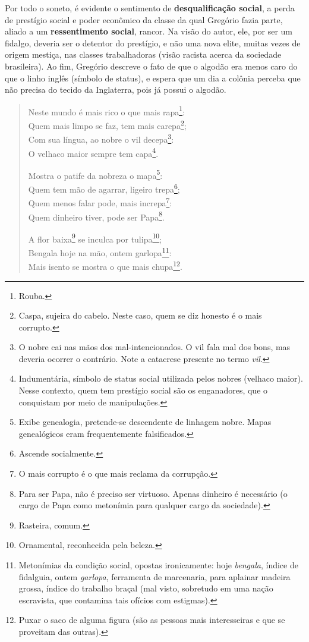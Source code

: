 Por todo o soneto, é evidente o sentimento de \textbf{desqualificação social}, a perda de prestígio social e poder econômico da classe da qual Gregório fazia parte, aliado a um \textbf{ressentimento social}, rancor. Na visão do autor, ele, por ser um fidalgo, deveria ser o detentor do prestígio, e não uma nova elite, muitas vezes de origem mestiça, nas classes trabalhadoras (visão racista acerca da sociedade brasileira). Ao fim, Gregório descreve o fato de que o algodão era menos caro do que o linho inglês (símbolo de status), e espera que um dia a colônia perceba que não precisa do tecido da Inglaterra, pois já possui o algodão.

\begin{verse}
Neste mundo é mais rico o que mais rapa\footnote{Rouba.}: \\
Quem mais limpo se faz, tem mais carepa\footnote{Caspa, sujeira do cabelo. Neste caso, quem se diz honesto é o mais corrupto.}; \\
Com sua língua, ao nobre o vil decepa\footnote{O nobre cai nas mãos dos mal-intencionados. O vil fala mal dos bons, mas deveria ocorrer o contrário. Note a catacrese presente no termo \textit{vil}.}: \\
O velhaco maior sempre tem capa\footnote{Indumentária, símbolo de status social utilizada pelos nobres (velhaco maior). Nesse contexto, quem tem prestígio social são os enganadores, que o conquistam por meio de manipulações.}.
			
Mostra o patife da nobreza o mapa\footnote{Exibe genealogia, pretende-se descendente de linhagem nobre. Mapas genealógicos eram frequentemente falsificados.}: \\
Quem tem mão de agarrar, ligeiro trepa\footnote{Ascende socialmente.}; \\
Quem menos falar pode, mais increpa\footnote{O mais corrupto é o que mais reclama da corrupção.}: \\
Quem dinheiro tiver, pode ser Papa\footnote{Para ser Papa, não é preciso ser virtuoso. Apenas dinheiro é necessário (o cargo de Papa como metonímia para qualquer cargo da sociedade).}. 
			
A flor baixa\footnote{Rasteira, comum.} se inculca por tulipa\footnote{Ornamental, reconhecida pela beleza.}; \\
Bengala hoje na mão, ontem garlopa\footnote{Metonímias da condição social, opostas ironicamente: hoje \textit{bengala}, índice de fidalguia, ontem \textit{garlopa}, ferramenta de marcenaria, para aplainar madeira grossa, índice do trabalho braçal (mal visto, sobretudo em uma nação escravista, que contamina tais ofícios com estigmas).}: \\
Mais isento se mostra o que mais chupa\footnote{Puxar o saco de alguma figura (são as pessoas mais interesseiras e que se proveitam das outras).}.
			

\end{verse}
